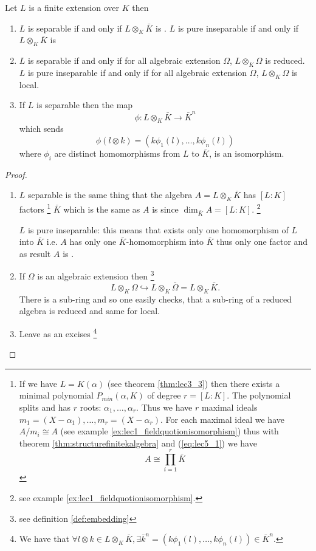 \begin{theorem}
  Let $L$ is a finite extension over $K$ then
  \begin{enumerate}
  \item $L$ is separable if and only if $L \otimes_K \bar{K}$
    is .
    $L$ is pure inseparable if and only if $L \otimes_K \bar{K}$
    is 
  \item $L$ is separable if and only if for all algebraic extension
    $\Omega$, $L \otimes_K \Omega$ is reduced.
    $L$ is pure inseparable if and only if for all algebraic extension
    $\Omega$, $L \otimes_K \Omega$ is local.
  \item If $L$ is separable then the map
    \[
    \phi: L \otimes_K \bar{K} \to \bar{K}^n
    \]
    which sends
    \[
    \phi\left(l \otimes k\right) =
    \left(
    k \phi_1\left(l\right),
    \dots,
    k \phi_n\left(l\right)
    \right)
    \]
    where $\phi_i$ are distinct homomorphisms from $L$ to $\bar{K}$, 
    is an isomorphism.
  \end{enumerate}
  \begin{proof}
    \begin{enumerate}
    \item $L$ separable is the same thing that the algebra
      $A = L\otimes_K \bar{K}$ has $\left[L:K\right]$ factors
      \footnote{
        If we have $L = K\left(\alpha\right)$
        (see theorem \ref{thm:lec3_3}) then
        there exists a minimal polynomial $P_{min}\left(\alpha,
        K\right)$ of degree $r = \left[L:K\right]$. The polynomial
        splits and has $r$ roots: $\alpha_1, \dots, \alpha_r$. Thus we
        have $r$ maximal ideals
        \(
        m_1 = \left(X - \alpha_1\right), \dots,
        m_r = \left(X - \alpha_r\right)
        \).
        For each maximal ideal we have $A/m_i \cong A$ (see example
        \ref{ex:lec1_fieldquotionisomorphism}) thus with theorem
        \ref{thm:structurefinitekalgebra} and (\ref{eq:lec5_1}) we have
        \[
        A \cong \prod_{i=1}^r \bar{K}
        \]
      }
      $\bar{K}$ which is the same as $A$ is 
      since $\dim_{\bar{K}} A = \left[L:K\right]$.
      \footnote{
        see example \ref{ex:lec1_fieldquotionisomorphism}.
      }

      $L$ is pure inseparable: this means that exists only one
      homomorphism of $L$ into $\bar{K}$ i.e. $A$ has only one
      $\bar{K}$-homomorphism into $\bar{K}$ thus only one factor and
      as result $A$ is .
    \item If $\Omega$ is an algebraic extension then
      \footnote {
        see definition \ref{def:embedding}
      }
      \[
      L \otimes_K \Omega \hookrightarrow L \otimes_K \bar{\Omega} =
      L \otimes_K \bar{K}.
      \]
      There is a sub-ring and so one easily checks, that a sub-ring of
      a reduced algebra is reduced and same for local.  
    \item Leave as an excises
      \footnote{
        We have that
        $\forall l \otimes k \in L \otimes_K \bar{K}, \exists
        \bar{k}^n = \left(
        k \phi_1\left(l\right),
        \dots,
        k \phi_n\left(l\right)
        \right) \in \bar{K}^n$.

}
\end{enumerate}
\end{proof}
\end{theorem}
